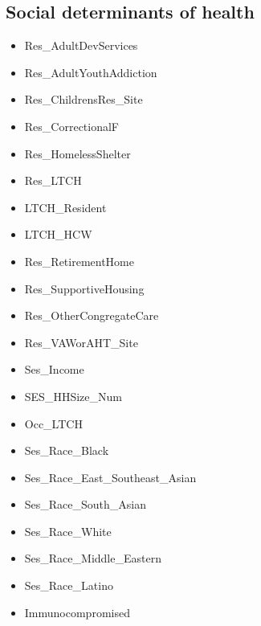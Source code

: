 \documentclass{article}
\begin{document}
\subsection{Social determinants of health}

\begin{itemize}
    \item Res\_AdultDevServices
    \item Res\_AdultYouthAddiction
    \item Res\_ChildrensRes\_Site
    \item Res\_CorrectionalF
    \item Res\_HomelessShelter
    \item Res\_LTCH
    \item LTCH\_Resident
    \item LTCH\_HCW
    \item Res\_RetirementHome
    \item Res\_SupportiveHousing
    \item Res\_OtherCongregateCare
    \item Res\_VAWorAHT\_Site
    \item Ses\_Income
    \item SES\_HHSize\_Num
    \item Occ\_LTCH
    \item Ses\_Race\_Black
    \item Ses\_Race\_East\_Southeast\_Asian
    \item Ses\_Race\_South\_Asian
    \item Ses\_Race\_White
    \item Ses\_Race\_Middle\_Eastern
    \item Ses\_Race\_Latino
    \item Immunocompromised
\end{itemize}



\end{document}
